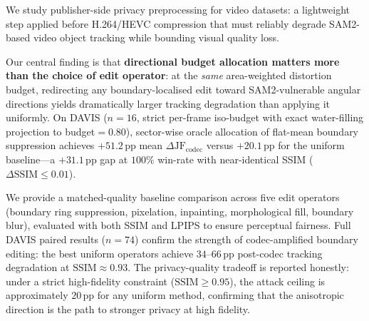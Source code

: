 We study publisher-side privacy preprocessing for video datasets: a lightweight step applied before H.264/HEVC compression that must reliably degrade SAM2-based video object tracking while bounding visual quality loss.

Our central finding is that \textbf{directional budget allocation matters more than the choice of edit operator}: at the \emph{same} area-weighted distortion budget, redirecting any boundary-localised edit toward SAM2-vulnerable angular directions yields dramatically larger tracking degradation than applying it uniformly.
On DAVIS ($n{=}16$, strict per-frame iso-budget with exact water-filling projection to budget${=}0.80$), sector-wise oracle allocation of flat-mean boundary suppression achieves $+51.2\,\mathrm{pp}$ mean $\Delta\mathrm{JF}_\mathrm{codec}$ versus $+20.1\,\mathrm{pp}$ for the uniform baseline---a $+31.1\,\mathrm{pp}$ gap at $100\%$ win-rate with near-identical SSIM ($\Delta\mathrm{SSIM} \leq 0.01$).

We provide a matched-quality baseline comparison across five edit operators (boundary ring suppression, pixelation, inpainting, morphological fill, boundary blur), evaluated with both SSIM and LPIPS to ensure perceptual fairness.
Full DAVIS paired results ($n{=}74$) confirm the strength of codec-amplified boundary editing: the best uniform operators achieve $34$--$66\,\mathrm{pp}$ post-codec tracking degradation at $\mathrm{SSIM} \approx 0.93$.
The privacy-quality tradeoff is reported honestly: under a strict high-fidelity constraint ($\mathrm{SSIM}{\geq}0.95$), the attack ceiling is approximately $20\,\mathrm{pp}$ for any uniform method, confirming that the anisotropic direction is the path to stronger privacy at high fidelity.
